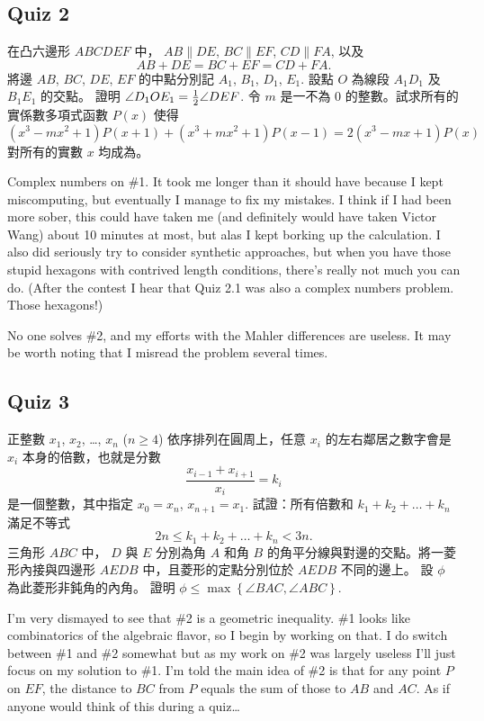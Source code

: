 \documentclass[11pt]{scrreprt}
\begin{document}
\subsection{Quiz 2}
\begin{enumerate}
  \ii 在凸六邊形 $ABCDEF$ 中， $AB \parallel DE$, $BC \parallel EF$, $CD \parallel FA$, 以及
  \[ AB+DE = BC+EF = CD+FA. \]
  將邊 $AB$, $BC$, $DE$, $EF$ 的中點分別記 $A_1$, $B_1$, $D_1$, $E_1$. 設點 $O$ 為線段 $A_1D_1$ 及 $B_1E_1$ 的交點。
  證明 $\angle D_1OE_1 = \frac{1}{2} \angle DEF$.
  \ii 令 $m$ 是一不為 $0$ 的整數。試求所有的實係數多項式函數 $P(x)$ 使得
  \[ \left( x^3-mx^2+1 \right) P(x+1) + (x^3+mx^2+1)P(x-1) = 2(x^3-mx+1)P(x) \]
  對所有的實數 $x$ 均成為。 %
\end{enumerate}
Complex numbers on \#1. It took me longer than it should have because I kept miscomputing,
but eventually I manage to fix my mistakes.
I think if I had been more sober,
this could have taken me (and definitely would have taken Victor Wang) about 10 minutes at most,
but alas I kept borking up the calculation.
I also did seriously try to consider synthetic approaches,
but when you have those stupid hexagons with contrived length conditions, there's really not much you can do.
(After the contest I hear that Quiz 2.1 was also a complex numbers problem. Those hexagons!)

No one solves \#2, and my efforts with the Mahler differences are useless.
It may be worth noting that I misread the problem several times.

\subsection{Quiz 3}
\begin{enumerate}
  \ii 正整數 $x_1$, $x_2$, \dots, $x_n$ ($n \ge 4$) 依序排列在圓周上，任意 $x_i$ 的左右鄰居之數字會是 $x_i$ 本身的倍數，也就是分數
  \[ \frac{x_{i-1}+x_{i+1}}{x_i} = k_i \]
  是一個整數，其中指定 $x_0 = x_n$, $x_{n+1} = x_1$. 試證：所有倍數和 $k_1 + k_2 + \dots + k_n$ 滿足不等式
  \[ 2n \le k_1 + k_2 + \dots + k_n < 3n. \]
  \ii 三角形 $ABC$ 中，  $D$ 與 $E$ 分別為角 $A$ 和角 $B$ 的角平分線與對邊的交點。將一菱形內接與四邊形 $AEDB$ 中，且菱形的定點分別位於 $AEDB$ 不同的邊上。 設 $\phi$ 為此菱形非鈍角的內角。 證明 $\phi \le \max \left\{ \angle BAC, \angle ABC \right\}$. %
\end{enumerate}
I'm very dismayed to see that \#2 is a geometric inequality.
\#1 looks like combinatorics of the algebraic flavor, so I begin by working on that.
I do switch between \#1 and \#2 somewhat but as my work on \#2 was largely
useless I'll just focus on my solution to \#1.
I'm told the main idea of \#2 is that for any point $P$ on $EF$,
the distance to $BC$ from $P$ equals the sum of those to $AB$ and $AC$.
As if anyone would think of this during a quiz\dots
\end{document}
